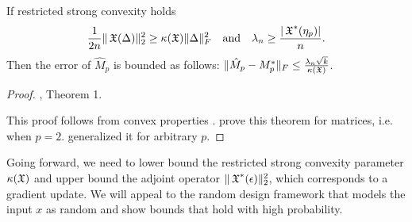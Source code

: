 

\begin{lemma}
If restricted strong convexity holds
$$\frac{1}{2n} \| \operatorname{\mathfrak{X}}( \Delta )\|_2^2 \ge \kappa(\operatorname{\mathfrak{X}}) \|\Delta\|^2_F \quad \text{and} \quad
\lambda_n \ge \frac{|\operatorname{\mathfrak{X}}^*(\eta_p)|}{n}.$$
Then the error of $\hat M_p$ is bounded as follows:
$\| \hat M_p - M_p^* \|_F \le \frac{\lambda_n \sqrt{k}}{\kappa(\operatorname{\mathfrak{X}})}$.
\end{lemma}
\begin{proof}
  \citet{Tomioka2011}, Theorem 1.

  This proof follows from convex properties .
  \citet{NegahbanWainwright2009} prove this theorem for matrices, i.e.
  when $p = 2$. \citet{Tomioka2011} generalized it for arbitrary $p$.
\end{proof}

Going forward, we need to lower bound the restricted strong convexity
parameter $\kappa(\operatorname{\mathfrak{X}})$ and upper bound the adjoint operator
$\|\operatorname{\mathfrak{X}}^*(\epsilon)\|_{2}^2$, which corresponds to a gradient update. We
will appeal to the random design framework that models the input $x$ as
random and show bounds that hold with high probability.

